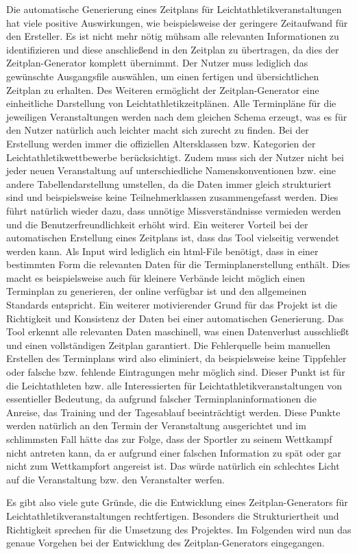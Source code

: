 Die automatische Generierung eines Zeitplans für Leichtathletikveranstaltungen hat viele positive Auswirkungen, wie beispielsweise der geringere Zeitaufwand für den Ersteller. Es ist nicht mehr nötig mühsam alle relevanten Informationen zu identifizieren und diese anschließend in den Zeitplan zu übertragen, da dies der Zeitplan-Generator komplett übernimmt. Der Nutzer muss lediglich das gewünschte Ausgangsfile auswählen, um einen fertigen und übersichtlichen Zeitplan zu erhalten. 
Des Weiteren ermöglicht der Zeitplan-Generator eine einheitliche Darstellung von Leichtathletikzeitplänen. Alle Terminpläne für die jeweiligen Veranstaltungen werden nach dem gleichen Schema erzeugt, was es für den Nutzer natürlich auch leichter macht sich zurecht zu finden. Bei der Erstellung werden immer die offiziellen Altersklassen bzw. Kategorien der Leichtathletikwettbewerbe berücksichtigt. Zudem muss sich der Nutzer nicht bei jeder neuen Veranstaltung auf unterschiedliche Namenskonventionen bzw. eine andere Tabellendarstellung umstellen, da die Daten immer gleich strukturiert sind und beispielsweise keine Teilnehmerklassen zusammengefasst werden. Dies führt natürlich wieder dazu, dass unnötige Missverständnisse vermieden werden und die Benutzerfreundlichkeit erhöht wird.
Ein weiterer Vorteil bei der automatischen Erstellung eines Zeitplans ist, dass das Tool vielseitig verwendet werden kann. Als Input wird lediglich ein html-File benötigt, dass in einer bestimmten Form die relevanten Daten für die Terminplanerstellung enthält. Dies macht es beispielsweise auch für kleinere Verbände leicht möglich einen Terminplan zu generieren, der online verfügbar ist und den allgemeinen Standards entspricht.
Ein weiterer motivierender Grund für das Projekt ist die Richtigkeit und Konsistenz der Daten bei einer automatischen Generierung. Das Tool erkennt alle relevanten Daten maschinell, was einen Datenverlust ausschließt und einen vollständigen Zeitplan garantiert. Die Fehlerquelle beim manuellen Erstellen des Terminplans wird also eliminiert, da beispielsweise keine Tippfehler oder falsche bzw. fehlende Eintragungen mehr möglich sind. Dieser Punkt ist für die Leichtathleten bzw. alle Interessierten für Leichtathletikveranstaltungen von essentieller Bedeutung, da aufgrund falscher Terminplaninformationen die Anreise, das Training und der Tagesablauf beeinträchtigt werden. Diese Punkte werden natürlich an den Termin der Veranstaltung ausgerichtet und im schlimmsten Fall hätte das zur Folge, dass der Sportler zu seinem Wettkampf nicht antreten kann, da er aufgrund einer falschen Information zu spät oder gar nicht zum Wettkampfort angereist ist. Das würde natürlich ein schlechtes Licht auf die Veranstaltung bzw. den Veranstalter werfen.

Es gibt also viele gute Gründe, die die Entwicklung eines Zeitplan-Generators für Leichtathletikveranstaltungen rechtfertigen. Besonders die Strukturiertheit und Richtigkeit sprechen für die Umsetzung des Projektes. Im Folgenden wird nun das genaue Vorgehen bei der Entwicklung des Zeitplan-Generators eingegangen.



